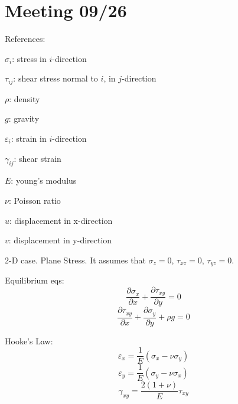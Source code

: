 \documentclass[11pt,letterpaper]{article}
\begin{document}
	
\section{Meeting 09/26}

References:
\begin{description}[font=$\bullet$\scshape\bfseries]
	\item[] $\sigma_i$: stress in $i$-direction
	\item[] $\tau_{ij}$: shear stress normal to $i$, in $j$-direction
	\item[] $\rho$: density
	\item[] $g$: gravity
	\item[] $\varepsilon_i$: strain in $i$-direction
	\item[] $\gamma_{ij}$: shear strain
	\item[] $E$: young's modulus
	\item[] $\nu$: Poisson ratio
	\item[] $u$: displacement in x-direction
	\item[] $v$: displacement in y-direction
\end{description}

2-D case. Plane Stress. It assumes that $\sigma_z = 0$, $\tau_{xz} = 0$, $\tau_{yz} = 0$.

Equilibrium eqs:
\begin{equation}
\frac{\partial \sigma_x}{\partial x} + \frac{\partial \tau_{xy}}{\partial y} = 0
\end{equation}
\begin{equation}
\frac{\partial \tau_{xy}}{\partial x} + \frac{\partial \sigma_y}{\partial y} + \rho g = 0
\end{equation}

Hooke's Law:
\begin{equation}
\varepsilon_x = \frac{1}{E} (\sigma_x - \nu \sigma_y)
\end{equation}
\begin{equation}
\varepsilon_y = \frac{1}{E} (\sigma_y - \nu \sigma_x)
\end{equation}
\begin{equation}
\gamma_{xy} = \frac{2(1+\nu)}{E} \tau_{xy}
\label{eq1}
\end{equation}
\end{document}
